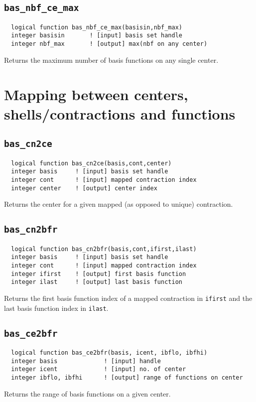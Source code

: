 \subsection{{\tt bas\_nbf\_ce\_max}}
\begin{verbatim}
  logical function bas_nbf_ce_max(basisin,nbf_max)
  integer basisin       ! [input] basis set handle
  integer nbf_max       ! [output] max(nbf on any center)
\end{verbatim}
Returns the maximum number of basis functions on any single center.

\section{Mapping between centers, shells/contractions and functions}

\subsection{{\tt bas\_cn2ce}}
\begin{verbatim}
  logical function bas_cn2ce(basis,cont,center)
  integer basis     ! [input] basis set handle
  integer cont      ! [input] mapped contraction index
  integer center    ! [output] center index
\end{verbatim}
Returns the center for a given mapped (as opposed to unique)
contraction.

\subsection{{\tt bas\_cn2bfr}}
\begin{verbatim}
  logical function bas_cn2bfr(basis,cont,ifirst,ilast)
  integer basis     ! [input] basis set handle
  integer cont      ! [input] mapped contraction index
  integer ifirst    ! [output] first basis function
  integer ilast     ! [output] last basis function     
\end{verbatim}
Returns the first basis function index of a mapped contraction in
{\tt ifirst} and the last basis function index in {\tt ilast}.

\subsection{{\tt bas\_ce2bfr}}
\begin{verbatim}
  logical function bas_ce2bfr(basis, icent, ibflo, ibfhi)
  integer basis             ! [input] handle
  integer icent             ! [input] no. of center
  integer ibflo, ibfhi      ! [output] range of functions on center
\end{verbatim}
Returns the range of basis functions on a given center.

